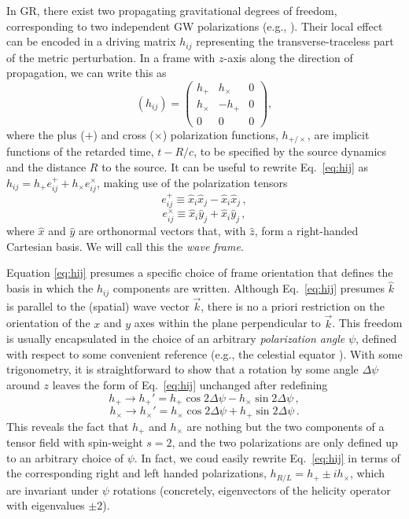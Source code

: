 \documentclass[aps,prd,twocolumn,superscriptaddress,preprintnumbers,floatfix,nofootinbib]{revtex4-2}
\newcommand{\beq}{\begin{equation}}
\newcommand{\eeq}{\end{equation}}
\newcommand*{\eq}[1]{Eq.~\eqref{eq:#1}}
\begin{document}
In GR, there exist two propagating gravitational degrees of freedom, corresponding to two independent GW polarizations (e.g., \cite{Thorne:1987af}).
Their local effect can be encoded in a driving matrix $h_{ij}$ representing the transverse-traceless part of the metric perturbation.
In a frame with $z$-axis along the direction of propagation, we can write this as
\beq \label{eq:hij}
(h_{ij}) = \begin{pmatrix}
h_+ & h_\times  & 0 \\
h_\times  & - h_+ & 0  \\
0 & 0 & 0
\end{pmatrix} ,
\eeq
where the plus ($+$) and cross ($\times$) polarization functions, $h_{+/\times}$, are implicit functions of the retarded time, $t - R/c$, to be specified by the source dynamics and the distance $R$ to the source.
It can be useful to rewrite \eq{hij} as $h_{ij} = h_+ e^+_{ij} + h_\times e^\times_{ij}$, making use of the polarization tensors
\beq
e^+_{ij} \equiv \hat{x}_i \hat{x}_j - \hat{x}_i \hat{x}_j \, ,
\eeq
\beq
e^\times_{ij} \equiv \hat{x}_i \hat{y}_j + \hat{x}_i \hat{y}_j\, ,
\eeq
where $\hat{x}$ and $\hat{y}$ are orthonormal vectors that, with $\hat{z}$, form a right-handed Cartesian basis.
We will call this the \emph{wave frame}.

Equation \eqref{eq:hij} presumes a specific choice of frame orientation that defines the basis in which the $h_{ij}$ components are written.
Although \eq{hij} presumes $\hat{k}$ is parallel to the (spatial) wave vector $\vec{k}$, there is no a priori restriction on the orientation of the $x$ and $y$ axes within the plane perpendicular to $\vec{k}$.
This freedom is usually encapsulated in the choice of an arbitrary \emph{polarization angle} $\psi$, defined with respect to some convenient reference (e.g., the celestial equator \cite{LALSuite:wave}).
With some trigonometry, it is straightforward to show that a rotation by some angle $\Delta \psi$ around $z$ leaves the form of \eq{hij} unchanged after redefining
\beq \label{eq:htransf}
h_+ \rightarrow h_+' = h_+ \cos 2\Delta \psi - h_\times \sin 2\Delta\psi \, ,
\eeq
\beq
h_\times \rightarrow h_\times' = h_\times \cos 2\Delta \psi + h_+ \sin 2\Delta\psi \, .
\eeq
This reveals the fact that $h_+$ and $h_\times$ are nothing but the two components of a tensor field with spin-weight $s=2$, and the two polarizations are only defined up to an arbitrary choice of $\psi$.
In fact, we coud easily rewrite \eq{hij} in terms of the corresponding right and left handed polarizations, $h_{R/L} = h_+ \pm i h_\times$, which are invariant under $\psi$ rotations (concretely, eigenvectors of the helicity operator with eigenvalues $\pm 2$).
\end{document}
